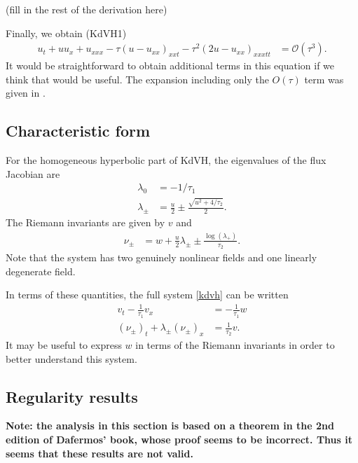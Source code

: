 \documentclass{article}
\theoremstyle{plain}
\theoremstyle{definition}
\numberwithin{theorem}{section}
\newcommand{\order}{{\mathcal O}}
\begin{document}
(fill in the rest of the derivation here)

Finally, we obtain (KdVH1)
\begin{align} \label{kdvh1}
    u_t + u u_x + u_{xxx} - \tau\left(u-u_{xx}  \right)_{xxt} - \tau^2\left(2u-u_{xx}\right)_{xxxtt} & = \order(\tau^3).
\end{align}
It would be straightforward to obtain additional terms in this equation if we think that would
be useful.
The expansion including only the $O(\tau)$ term was given in \cite[eq.~(14)]{besse2022perfectly}.

\subsection{Characteristic form}
For the homogeneous hyperbolic part of KdVH, the eigenvalues of the flux Jacobian are
\begin{align}
    \lambda_0 & = -1/\tau_1 \\
    \lambda_\pm & = \frac{u}{2} \pm \frac{\sqrt{u^2 +4/\tau_2}}{2}.
\end{align}
The Riemann invariants are given by $v$ and
\begin{align}
\nu_\pm & = w + \frac{u}{2} \lambda_\pm \pm \frac{\log(\lambda_+)}{\tau_2}.
\end{align}
Note that the system has two genuinely nonlinear fields and one linearly
degenerate field.

In terms of these quantities, the full system \eqref{kdvh} can be written
\begin{subequations}
\begin{align}
    v_t - \frac{1}{\tau_1} v_x & = -\frac{1}{\tau_1} w \\
    (\nu_\pm)_t + \lambda_\pm (\nu_\pm)_x & = \frac{1}{\tau_2} v.
\end{align}
\end{subequations}
It may be useful to express $w$ in terms of the Riemann invariants
in order to better understand this system.




\subsection{Regularity results}
{\bf Note: the analysis in this section is based on a theorem in the 2nd
edition of Dafermos' book, whose proof seems to be incorrect.  Thus it
seems that these results are not valid.}
\end{document}
